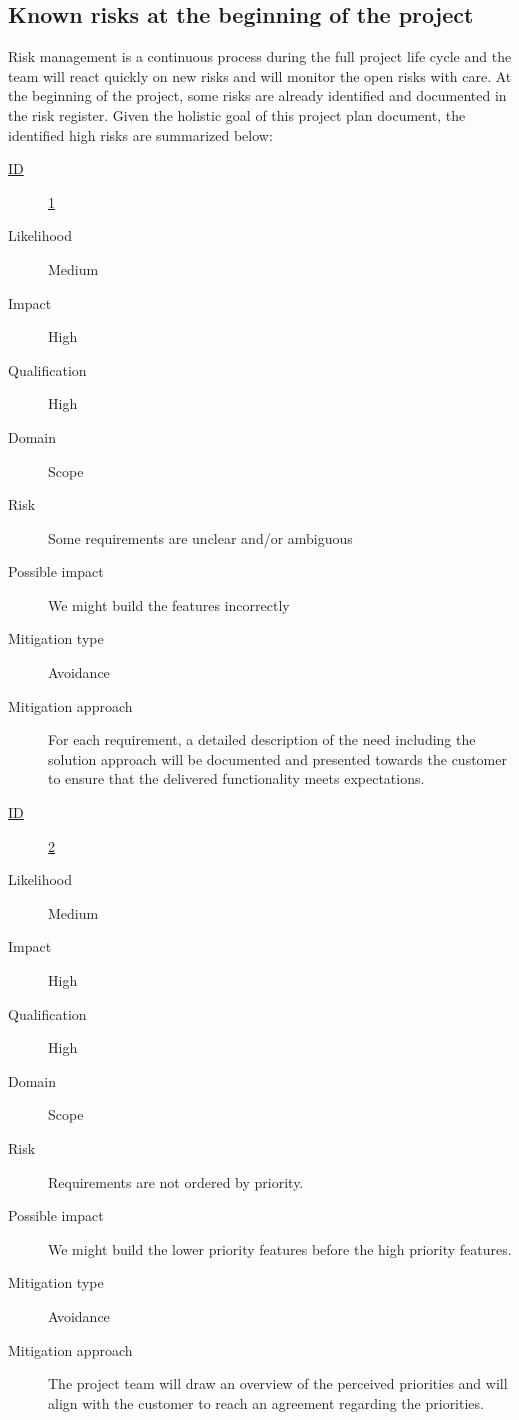 \subsection{Known risks at the beginning of the project}
Risk management is a continuous process during the full project life cycle and the team will react quickly on new risks and will monitor the open risks with care.
At the beginning of the project, some risks are already identified and documented in the risk register.
Given the holistic goal of this project plan document, the identified high risks are summarized below:

\begin{description}
	\item [\underline{ID}]
	\underline{1}
	\item[Likelihood]
	Medium
	\item[Impact]
	High
	\item[Qualification]
	High
	\item[Domain]
	Scope
	\item[Risk]
	Some requirements are unclear and/or ambiguous
	\item[Possible impact]
	We might build the features incorrectly
	\item[Mitigation type]
	Avoidance
	\item[Mitigation approach]
	For each requirement, a detailed description of the need including the solution approach will be documented and presented towards the customer to ensure that the delivered functionality meets expectations.
\end {description}

\begin{description}
	\item [\underline{ID}]
	\underline{2}
	\item[Likelihood]
	Medium
	\item[Impact]
	High
	\item[Qualification]
	High
	\item[Domain]
	Scope
	\item[Risk]
	Requirements are not ordered by priority.
	\item[Possible impact]
	We might build the lower priority features before the high priority features.
	\item[Mitigation type]
	Avoidance
	\item[Mitigation approach]
	The project team will draw an overview of the perceived priorities and will align with the customer to reach an agreement regarding the priorities.
\end {description}


